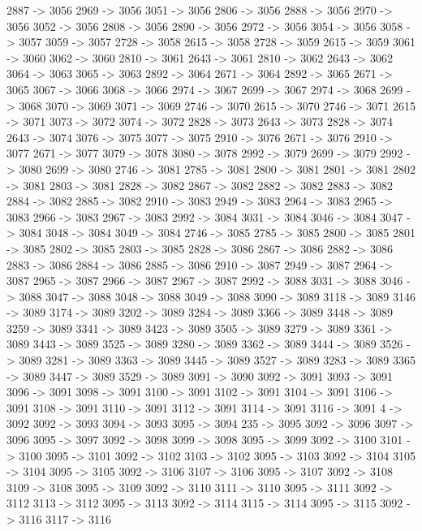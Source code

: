 {	2887 -> 3056
	2969 -> 3056
	3051 -> 3056
	2806 -> 3056
	2888 -> 3056
	2970 -> 3056
	3052 -> 3056
	2808 -> 3056
	2890 -> 3056
	2972 -> 3056
	3054 -> 3056
	3058 -> 3057
	3059 -> 3057
	2728 -> 3058
	2615 -> 3058
	2728 -> 3059
	2615 -> 3059
	3061 -> 3060
	3062 -> 3060
	2810 -> 3061
	2643 -> 3061
	2810 -> 3062
	2643 -> 3062
	3064 -> 3063
	3065 -> 3063
	2892 -> 3064
	2671 -> 3064
	2892 -> 3065
	2671 -> 3065
	3067 -> 3066
	3068 -> 3066
	2974 -> 3067
	2699 -> 3067
	2974 -> 3068
	2699 -> 3068
	3070 -> 3069
	3071 -> 3069
	2746 -> 3070
	2615 -> 3070
	2746 -> 3071
	2615 -> 3071
	3073 -> 3072
	3074 -> 3072
	2828 -> 3073
	2643 -> 3073
	2828 -> 3074
	2643 -> 3074
	3076 -> 3075
	3077 -> 3075
	2910 -> 3076
	2671 -> 3076
	2910 -> 3077
	2671 -> 3077
	3079 -> 3078
	3080 -> 3078
	2992 -> 3079
	2699 -> 3079
	2992 -> 3080
	2699 -> 3080
	2746 -> 3081
	2785 -> 3081
	2800 -> 3081
	2801 -> 3081
	2802 -> 3081
	2803 -> 3081
	2828 -> 3082
	2867 -> 3082
	2882 -> 3082
	2883 -> 3082
	2884 -> 3082
	2885 -> 3082
	2910 -> 3083
	2949 -> 3083
	2964 -> 3083
	2965 -> 3083
	2966 -> 3083
	2967 -> 3083
	2992 -> 3084
	3031 -> 3084
	3046 -> 3084
	3047 -> 3084
	3048 -> 3084
	3049 -> 3084
	2746 -> 3085
	2785 -> 3085
	2800 -> 3085
	2801 -> 3085
	2802 -> 3085
	2803 -> 3085
	2828 -> 3086
	2867 -> 3086
	2882 -> 3086
	2883 -> 3086
	2884 -> 3086
	2885 -> 3086
	2910 -> 3087
	2949 -> 3087
	2964 -> 3087
	2965 -> 3087
	2966 -> 3087
	2967 -> 3087
	2992 -> 3088
	3031 -> 3088
	3046 -> 3088
	3047 -> 3088
	3048 -> 3088
	3049 -> 3088
	3090 -> 3089
	3118 -> 3089
	3146 -> 3089
	3174 -> 3089
	3202 -> 3089
	3284 -> 3089
	3366 -> 3089
	3448 -> 3089
	3259 -> 3089
	3341 -> 3089
	3423 -> 3089
	3505 -> 3089
	3279 -> 3089
	3361 -> 3089
	3443 -> 3089
	3525 -> 3089
	3280 -> 3089
	3362 -> 3089
	3444 -> 3089
	3526 -> 3089
	3281 -> 3089
	3363 -> 3089
	3445 -> 3089
	3527 -> 3089
	3283 -> 3089
	3365 -> 3089
	3447 -> 3089
	3529 -> 3089
	3091 -> 3090
	3092 -> 3091
	3093 -> 3091
	3096 -> 3091
	3098 -> 3091
	3100 -> 3091
	3102 -> 3091
	3104 -> 3091
	3106 -> 3091
	3108 -> 3091
	3110 -> 3091
	3112 -> 3091
	3114 -> 3091
	3116 -> 3091
	4 -> 3092
	3092 -> 3093
	3094 -> 3093
	3095 -> 3094
	235 -> 3095
	3092 -> 3096
	3097 -> 3096
	3095 -> 3097
	3092 -> 3098
	3099 -> 3098
	3095 -> 3099
	3092 -> 3100
	3101 -> 3100
	3095 -> 3101
	3092 -> 3102
	3103 -> 3102
	3095 -> 3103
	3092 -> 3104
	3105 -> 3104
	3095 -> 3105
	3092 -> 3106
	3107 -> 3106
	3095 -> 3107
	3092 -> 3108
	3109 -> 3108
	3095 -> 3109
	3092 -> 3110
	3111 -> 3110
	3095 -> 3111
	3092 -> 3112
	3113 -> 3112
	3095 -> 3113
	3092 -> 3114
	3115 -> 3114
	3095 -> 3115
	3092 -> 3116
	3117 -> 3116
}
